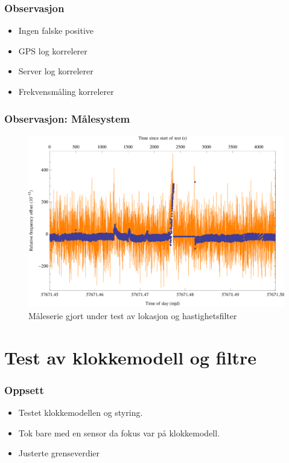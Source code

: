 \documentclass[xcolor=table]{beamer}
\begin{document}
\begin{frame}
\frametitle{Observasjon}
      \begin{itemize}
        \item Ingen falske positive
        \item GPS log korrelerer
        \item Server log korrelerer
        \item Frekvensmåling korrelerer
      \end{itemize}
\end{frame}

\begin{frame}
\frametitle{Observasjon: Målesystem}
      \begin{figure}
        \includegraphics[scale=0.70]{thesis/graphics/cns91-and-csac-telemetry-frequency-1.png}
        \caption{Måleserie gjort under test av lokasjon og hastighetsfilter}
      \end{figure}
\end{frame}

\section{Test av klokkemodell og filtre}
\begin{frame}
\frametitle{Oppsett}
  \begin{itemize}
    \item Testet klokkemodellen og styring.
    \item Tok bare med en sensor da fokus var på klokkemodell.
    \item Justerte grenseverdier
  \end{itemize}
\end{frame}
\end{document}
